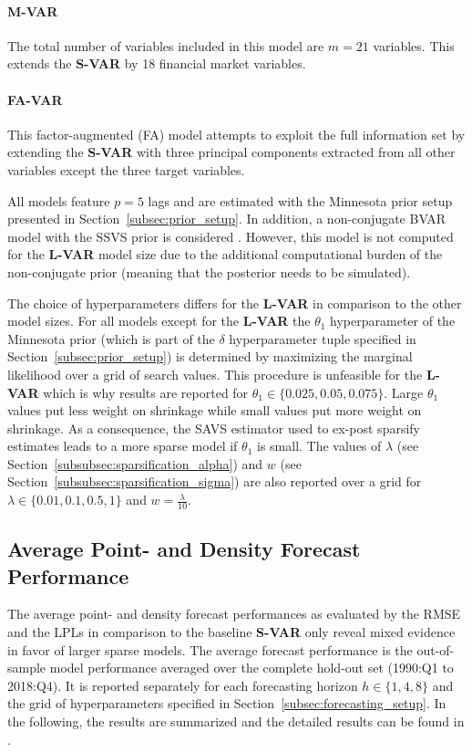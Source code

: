 \paragraph{M-VAR} The total number of variables included in this model are $m = 21$ variables. This extends the \textbf{S-VAR} by 18 financial market variables.

\paragraph{FA-VAR} This factor-augmented (FA) model attempts to exploit the full information set by extending the \textbf{S-VAR} with three principal components extracted from all other variables except the three target variables.
\\\par %
All models feature $p = 5$ lags and are estimated with the Minnesota prior setup presented in Section~\ref{subsec:prior_setup}. In addition, a non-conjugate BVAR model with the SSVS prior is considered \parencite{george_bayesian_2008}. However, this model is not computed for the \textbf{L-VAR} model size due to the additional computational burden of the non-conjugate prior (meaning that the posterior needs to be simulated).

The choice of hyperparameters differs for the \textbf{L-VAR} in comparison to the other model sizes. For all models except for the \textbf{L-VAR} the $\theta_1$ hyperparameter of the Minnesota prior (which is part of the $\delta$ hyperparameter tuple specified in Section~\ref{subsec:prior_setup}) is determined by maximizing the marginal likelihood over a grid of search values. This procedure is unfeasible for the \textbf{L-VAR} which is why results are reported for $\theta_1 \in \{0.025,0.05,0.075\}$. Large $\theta_1$ values put less weight on shrinkage while small values put more weight on shrinkage. As a consequence, the SAVS estimator used to ex-post sparsify estimates leads to a more sparse model if $\theta_1$ is small. The values of $\lambda$ (see Section~\ref{subsubsec:sparsification_alpha}) and $w$ (see Section~\ref{subsubsec:sparsification_sigma}) are also reported over a grid for $\lambda \in \{0.01,0.1,0.5,1\}$ and $w = \frac{\lambda}{10}$.

\subsection{Average Point- and Density Forecast Performance}
\label{subsec:avg_forecast_performance}
The average point- and density forecast performances as evaluated by the RMSE and the LPLs in comparison to the baseline \textbf{S-VAR} only reveal mixed evidence in favor of larger sparse models. The average forecast performance is the out-of-sample model performance averaged over the complete hold-out set (1990:Q1 to 2018:Q4). It is reported separately for each forecasting horizon $h \in \{1,4,8\}$ and the grid of hyperparameters specified in Section~\ref{subsec:forecasting_setup}. In the following, the results are summarized and the detailed results can be found in \textcite[Tables 2, 3, 4, and 5]{hauzenberger_combining_2021}.

